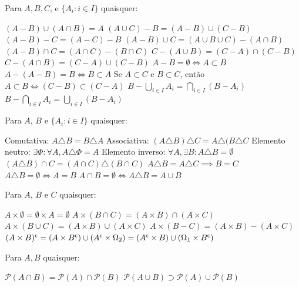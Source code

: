 \begin{theorem}
	Para $A,B,C$, e $\{A_i: i \in I\}$ quaisquer:	
	\begin{outline}[enumerate]
		\1 \( (A-B)\cup(A\cap B) = A\)
		\1 \( (A\cup C) - B = (A-B)\cup(C-B) \)
		\1 \( (A-B)-C = (A-C)-B \)
		\1 \((A-B)\cup C = (A\cup B \cup C) - (A\cap B)\)
		\1 \((A-B)\cap C = (A\cap C) - (B\cap C)\)
		\1 \(C-(A\cup B) = (C-A)\cap(C-B)\)
		\1 \(C-(A\cap B) = (C-A)\cup(C-B)\)
		\1 \(A-B=\emptyset \iff A \subset B\)
		\1 \( A-(A-B)=B \iff B\subset A\) 
		\1 Se $A\subset C$ e $B\subset C$, então $A\subset B \iff (C-B)\subset(C-A)$ 
		\1 \( B - \bigcup_{i\in I}A_i = \bigcap_{i\in I}(B-A_i) \)
		\1 \( B - \bigcap_{i\in I}A_i = \bigcup_{i\in I}(B-A_i) \)
	\end{outline}
\end{theorem}

\begin{theorem}
	Para $A$, $B$ e $\{A_i: i \in I\}$ quaisquer:	
	\begin{outline}[enumerate]
		\1 Comutativa: \( A \triangle B = B\triangle A \)
		\1 Associativa: \( (A\triangle B)\triangle C = A\triangle(B\triangle C \)
		\1 Elemento neutro: \(\exists \Phi : \forall A, A\triangle\Phi = A \)
		\1 Elemento inverso: \(\forall A, \exists B: A\triangle B = \emptyset \)
		\1 \( (A\triangle B)\cap C = (A\cap C)\triangle(B\cap C) \)
		\1 \( A\triangle B = A\triangle C \implies B=C\)
		\1 \( A\triangle B = \emptyset \iff A=B\)
		\1 \( A\cap B = \emptyset \iff A\triangle B = A\cup B \)
	\end{outline}
\end{theorem}

\begin{theorem}
	Para $A$, $B$ e $C$ quaisquer:
	\begin{outline}[enumerate]
		\1 \( A\times\emptyset = \emptyset \times A = \emptyset \)
		\1 \( A\times(B\cap C) = (A\times B)\cap(A\times C) \)
		\1 \( A\times(B\cup C) = (A\times B)\cup(A\times C) \)
		\1 \( A\times(B-C) = (A\times B)-(A\times C) \)
		\1 \( (A\times B)^\mathsf{c} = (A\times B^\mathsf{c})\cup(A^\mathsf{c}\times \Omega_2) 
		=  (A^\mathsf{c}\times B)\cup(\Omega_1 \times B^\mathsf{c}) \)
	\end{outline}
\end{theorem}

\begin{theorem} Para $A,B$ quaisquer:
\end{theorem}
	\begin{outline}[enumerate]
		\1 \( \mathcal{P}(A\cap B) = \mathcal{P}(A)\cap\mathcal{P}(B)\)
		\1 \( \mathcal{P}(A\cup B) \supset \mathcal{P}(A)\cup\mathcal{P}(B)\) 
	\end{outline}


